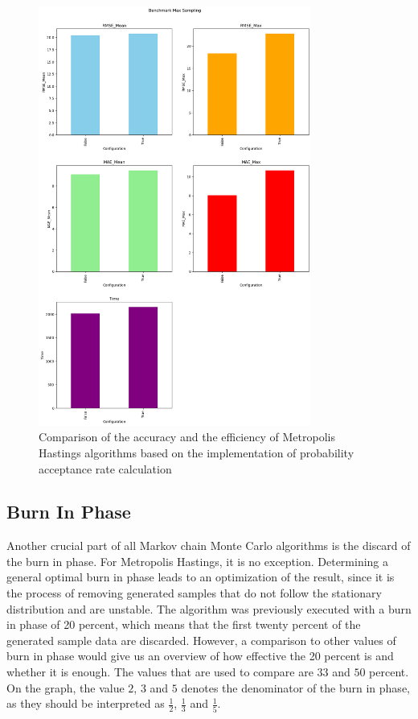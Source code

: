\begin{figure}
    \centering
    \includegraphics[width=0.8\textwidth]{figures/basic_mh/benchmark/max_sampling.png}
    \captionsetup{width=.8\textwidth}
    \caption{Comparison of the accuracy and the efficiency of Metropolis Hastings algorithms based on the implementation of probability acceptance rate calculation}
    \label{fig:enter-label}
\end{figure}



\subsection{Burn In Phase}
Another crucial part of all Markov chain Monte Carlo algorithms is the discard of the burn in phase. For Metropolis Hastings, it is no exception. Determining a general optimal burn in phase leads to an optimization of the result, since it is the process of removing generated samples that do not follow the stationary distribution and are unstable. The algorithm was previously executed with a burn in phase of 20 percent, which means that the first twenty percent of the generated sample data are discarded. However, a comparison to other values of burn in phase would give us an overview of how effective the 20 percent is and whether it is enough. The values that are used to compare are $33$ and $50$ percent. On the graph, the value $2$, $3$ and $5$ denotes the denominator of the burn in phase, as they should be interpreted as $\frac 1 2$, $\frac 1 3$ and $\frac 1 5$.

